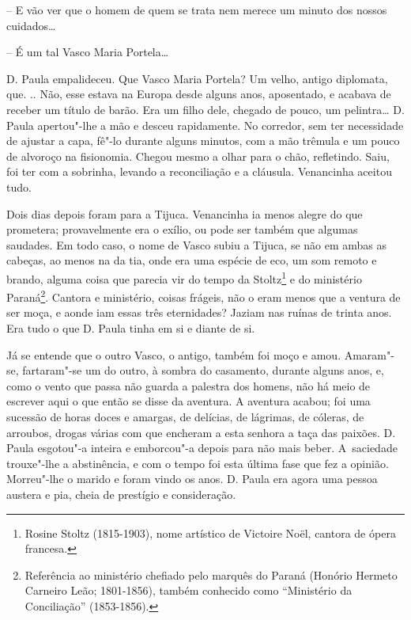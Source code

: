 -- E vão ver que o homem de quem se trata nem merece um minuto dos
nossos cuidados\ldots{}

-- É um tal Vasco Maria Portela\ldots{}

D. Paula empalideceu. Que Vasco Maria Portela? Um velho, antigo
diplomata, que. .. Não, esse estava na Europa desde alguns anos,
aposentado, e acabava de receber um título de barão. Era um filho dele,
chegado de pouco, um pelintra\ldots{} D. Paula apertou"-lhe a mão e desceu
rapidamente. No corredor, sem ter necessidade de ajustar a capa, fê"-lo
durante alguns minutos, com a mão trêmula e um pouco de alvoroço na
fisionomia. Chegou mesmo a olhar para o chão, refletindo. Saiu, foi ter
com a sobrinha, levando a reconciliação e a cláusula. Venancinha aceitou
tudo.

Dois dias depois foram para a Tijuca. Venancinha ia menos alegre do que
prometera; provavelmente era o exílio, ou pode ser também que algumas
saudades. Em todo caso, o nome de Vasco subiu a Tijuca, se não em ambas
as cabeças, ao menos na da tia, onde era uma espécie de eco, um som
remoto e brando, alguma coisa que parecia vir do tempo da
Stoltz\footnote{Rosine Stoltz (1815-1903), nome artístico de Victoire
  Noël, cantora de ópera francesa.} e do ministério Paraná\footnote{Referência
  ao ministério chefiado pelo marquês do Paraná (Honório Hermeto
  Carneiro Leão; 1801-1856), também conhecido como ``Ministério da
  Conciliação'' (1853-1856).}. Cantora e ministério, coisas frágeis, não
o eram menos que a ventura de ser moça, e aonde iam essas três
eternidades? Jaziam nas ruínas de trinta anos. Era tudo o que D. Paula
tinha em si e diante de si.

Já se entende que o outro Vasco, o antigo, também foi moço e amou.
Amaram"-se, fartaram"-se um do outro, à sombra do casamento, durante
alguns anos, e, como o vento que passa não guarda a palestra dos homens,
não há meio de escrever aqui o que então se disse da aventura. A
aventura acabou; foi uma sucessão de horas doces e amargas, de delícias,
de lágrimas, de cóleras, de arroubos, drogas várias com que encheram a
esta senhora a taça das paixões. D. Paula esgotou"-a inteira e emborcou"-a
depois para não mais beber. A~saciedade trouxe"-lhe a abstinência, e com
o tempo foi esta última fase que fez a opinião. Morreu"-lhe o marido e
foram vindo os anos. D. Paula era agora uma pessoa austera e pia, cheia
de prestígio e consideração.

